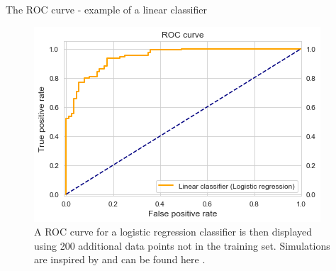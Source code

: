 \documentclass[xcolor={usenames,dvipsnames},handout]{beamer}
\begin{document}
\begin{frame}{The ROC curve - example of a linear classifier}

\begin{figure}[h]
		\center
		\includegraphics[height=0.75\textheight]{roc}
		\caption{A ROC curve for a  logistic regression classifier is then displayed using 200 additional data points not in the training set. Simulations are inspired by  and can be found here .}
	\end{figure}
\end{frame}
\end{document}
